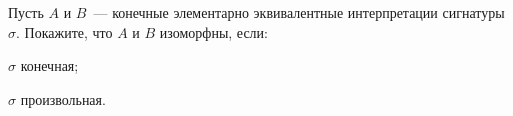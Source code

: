 Пусть $A$ и $B$~--- конечные элементарно эквивалентные интерпретации сигнатуры $\sigma$.
Покажите, что $A$ и $B$ изоморфны, если:
\begin{enumcyr}
    \item $\sigma$ конечная;
    \item $\sigma$ произвольная.
\end{enumcyr}
